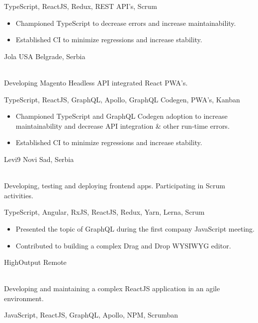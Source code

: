 \documentclass[]{cv-style}          %
\begin{document}
\begin{entrylist}
{    \subtitle{Tech stack:} TypeScript, ReactJS, Redux, REST API's, Scrum\\
    \subtitle{Detailed achievements:}
    \begin{itemize}
      \item Championed TypeScript to decrease errors and increase maintainability.
      \item Established CI to minimize regressions and increase stability.
    \end{itemize}}
  \entry
  {}
  {Jola USA}
  {Belgrade, Serbia}
  {\\
    Developing Magento Headless API integrated React PWA's.\\
    \subtitle{Tech stack:} TypeScript, ReactJS, GraphQL, Apollo, GraphQL Codegen, PWA's, Kanban\\
    \subtitle{Detailed achievements:}
    \begin{itemize}
      \item Championed TypeScript and GraphQL Codegen adoption to increase maintainability and decrease API integration \& other run-time errors.
      \item Established CI to minimize regressions and increase stability.
    \end{itemize}}
  \entry
  {}
  {Levi9}
  {Novi Sad, Serbia}
  {\\
    Developing, testing and deploying frontend apps. Participating in Scrum activities.\\
    \subtitle{Tech stack:} TypeScript, Angular, RxJS, ReactJS, Redux, Yarn, Lerna, Scrum\\
    \subtitle{Detailed achievements:}
    \begin{itemize}
      \item Presented the topic of GraphQL during the first company JavaScript meeting.
      \item Contributed to building a complex Drag and Drop WYSIWYG editor.
    \end{itemize}}
  \entry
  {}
  {HighOutput}
  {Remote}
  {\\
    Developing and maintaining a complex ReactJS application in an agile environment.\\
    \subtitle{Tech stack:} JavaScript, ReactJS, GraphQL, Apollo, NPM, Scrumban \\
}
\end{entrylist}
\end{document}
